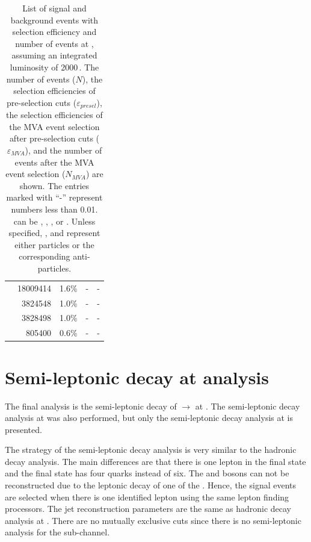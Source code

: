\begin{table}[!htbp]
\begin{tabular}{lrrrr}
\hline
\gammagamma{\Pphoton}{\BS}{\Pphoton}{\BS}{ \Pquark \Pquark \Pquark \Pquark}& 18009414  & 1.6\%&   - & - \\
\gammagamma{\Pphoton}{\BS}{\Pphoton}{\EPA}{ \Pquark \Pquark \Pquark \Pquark}& 3824548  & 1.0\%&  - & - \\
\gammagamma{\Pphoton}{\EPA}{\Pphoton}{\BS}{ \Pquark \Pquark \Pquark \Pquark}& 3828498& 1.0\%&  - & - \\
\gammagamma{\Pphoton}{\EPA}{\Pphoton}{\EPA}{ \Pquark \Pquark \Pquark \Pquark}& 805400 & 0.6\%&  - & - \\
\hline \hline
\end{tabular}
\caption[List of signal and background selection efficiencies and event numbers after MVA application at  .]
{List of signal and background events with selection efficiency and number of events at , assuming an integrated  luminosity of 2000\,. The number of events ($N$), the selection efficiencies of pre-selection cuts ($\varepsilon_{presel}$), the selection efficiencies of the MVA event selection after pre-selection cuts ($\varepsilon_{MVA}$), and the number of events after the MVA event selection ($N_{MVA}$) are shown. The entries marked with ``-'' represent  numbers less than 0.01. \Pquark can be \Pup, \Pdown, \Pstrange, \Pbottom or \Ptop. Unless specified, \Pquark, \Plepton and \Pnu represent either particles or the corresponding anti-particles.}
\label{tab:doubleHiggs3TeVMVA}
\end{table}

\section{Semi-leptonic decay at  analysis}

The final analysis is the semi-leptonic \WW decay of \eeToHH $\to$ \HepProcess{ \Pbottom \APbottom \PWplus \PWminus \Pnu \APnu}  at . The semi-leptonic decay analysis at  was also performed, but only the semi-leptonic decay analysis at  is presented.

The strategy of the semi-leptonic decay  analysis is very similar to the hadronic decay analysis. The main differences are that there is one lepton in the final state and the final state has four quarks instead of six. The \HWW and \PW bosons can not be reconstructed due to the leptonic decay of one of the . Hence, the signal events are selected when there is one identified lepton using the same lepton finding processors. The jet reconstruction parameters are the same as hadronic decay analysis at . There are no mutually exclusive cuts since there is no semi-leptonic analysis for the \eeToHHbbbb sub-channel.

